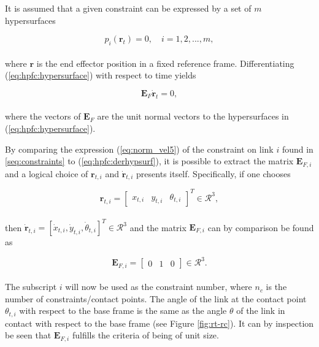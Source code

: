 It is assumed that a given constraint can be expressed by a set of $m$ hypersurfaces

\begin{equation}\label{eq:hpfc:hypersurface}
    p_i(\mathbf{r}_t) = 0, \quad i = 1, 2, ..., m,
\end{equation}
\\
where $\mathbf{r}$ is the end effector position in a fixed reference frame. Differentiating (\ref{eq:hpfc:hypersurface}) with respect to time yields

\begin{equation}\label{eq:hpfc:derhypsurf}
    \mathbf{E}_F \mathbf{\dot{r}}_t = 0,
\end{equation}
\\
where the vectors of $\mathbf{E}_F$ are the unit normal vectors to the hypersurfaces in (\ref{eq:hpfc:hypersurface}).

By comparing the expression (\ref{eq:norm_vel5}) of the constraint on link $i$ found in \ref{seq:constraints} to (\ref{eq:hpfc:derhypsurf}), it is possible to extract the matrix $\mathbf{E}_{F,i}$ and a logical choice of $\mathbf{r}_{t,i}$ and $\mathbf{\dot{r}}_{t,i}$ presents itself.
Specifically, if one chooses

\begin{equation}
    \mathbf{r}_{t,i} =
    \begin{bmatrix}
        x_{t,i} & y_{t,i} & \theta_{t,i}
    \end{bmatrix}^T \in \mathcal{R}^3,
\end{equation}
\\
then $\mathbf{\dot{r}}_{t,i} = [\dot{x}_{t,i}, \dot{y}_{t,i}, \dot{\theta}_{t,i}]^T \in \mathcal{R}^3$ and the matrix $\mathbf{E}_{F,i}$ can by comparison be found as

\begin{equation}
    \mathbf{E}_{F,i} =
    \begin{bmatrix}
        0 & 1 & 0
    \end{bmatrix} \in \mathcal{R}^3.
\end{equation}
\\
The subscript $i$ will now be used as the constraint number, where $n_c$ is the number of constraints/contact points.
The angle of the link at the contact point $\theta_{t,i}$ with respect to the base frame is the same as the angle $\theta$ of the link in contact with respect to the base frame (see Figure \ref{fig:rt-rc}). It can by inspection be seen that $\mathbf{E}_{F,i}$ fulfills the criteria of being of unit size.

